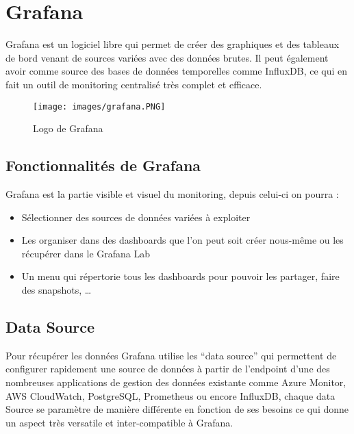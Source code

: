\documentclass[oneside,12pt]{report}
\begin{document}
\newpage

\section{Grafana}

Grafana est un logiciel libre qui permet de créer des graphiques et des tableaux de bord venant de sources variées avec des données brutes. Il peut également avoir comme source des bases de données temporelles comme InfluxDB, ce qui en fait un outil de monitoring centralisé très complet et efficace. 

\begin{figure}[h]
    \centering
    \texttt{[image: images/grafana.PNG]}
    \caption{Logo de Grafana}
    \label{fig:mesh1}
\end{figure}

\subsection{Fonctionnalités de Grafana}

Grafana est la partie visible et visuel du monitoring, depuis celui-ci on pourra :

\begin{itemize}

    \item Sélectionner des sources de données variées à exploiter
    
    \item Les organiser dans des dashboards que l'on peut soit créer nous-même ou les récupérer dans le Grafana Lab
    
    \item Un menu qui répertorie tous les dashboards pour pouvoir les partager, faire des snapshots, …
    
\end{itemize}



\subsection{Data Source}

Pour récupérer les données Grafana utilise les “data source” qui permettent de configurer rapidement une source de données à partir de l'endpoint d'une des nombreuses applications de gestion des données existante comme Azure Monitor, AWS CloudWatch, PostgreSQL, Prometheus ou encore InfluxDB, chaque data Source se paramètre de manière différente en fonction de ses besoins ce qui donne un aspect très versatile et inter-compatible à Grafana.
\end{document}
